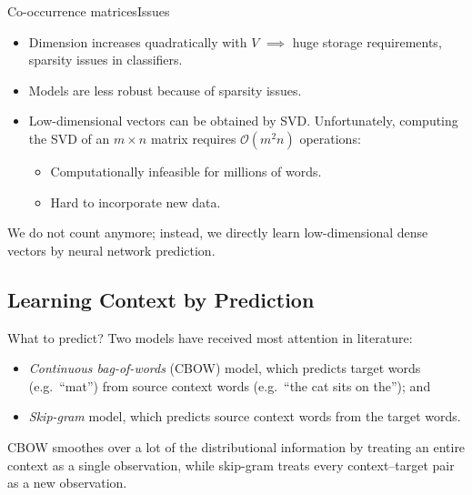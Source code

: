 \documentclass[serif, xcolor={svgnames, table}, usepdftitle=false]{beamer}
\begin{document}
\begin{frame}{Co-occurrence matrices}{Issues}
  \begin{itemize}
  \item Dimension increases quadratically with \(V\) \(\implies\) huge storage
    requirements, sparsity issues in classifiers.
  \item Models are less robust because of sparsity issues.
  \item Low-dimensional vectors can be obtained by SVD.  Unfortunately,
    computing the SVD of an \(m \times n\) matrix requires
    \(\mathcal{O}(m^2 n)\) operations:
    \begin{itemize}
    \item Computationally infeasible for millions of words.
    \item Hard to incorporate new data.
    \end{itemize}
  \end{itemize}

    We do not count anymore; instead, we
  directly learn low-dimensional dense vectors by neural network prediction.
\end{frame}

\subsection{Learning Context by Prediction}

\begin{frame}{What to predict?}
  Two models have received most attention in literature:
  \begin{itemize}
  \item \emph{Continuous bag-of-words} (CBOW) model, which predicts target words
    (e.g.\ ``mat'') from source context words (e.g.\ ``the cat sits on the'');
    and
  \item \emph{Skip-gram} model, which predicts source context words from the
    target words.
  \end{itemize}

  CBOW smoothes over a lot of the distributional information by treating an
  entire context as a single observation, while skip-gram treats every
  context--target pair as a new observation.
\end{frame}
\end{document}
